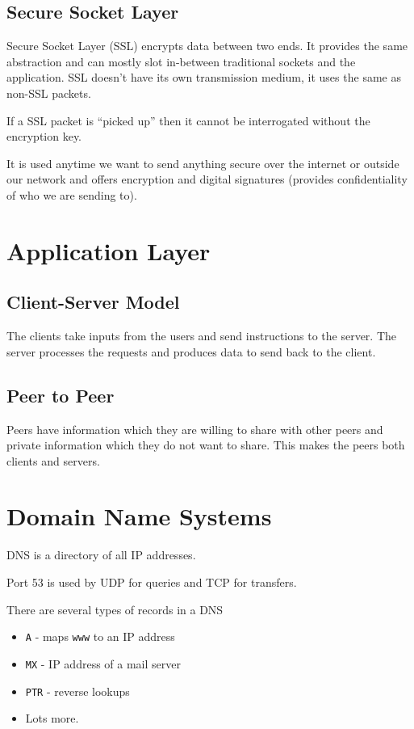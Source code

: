 \subsection*{Secure Socket Layer}

Secure Socket Layer (SSL) encrypts data between two ends. It provides the same abstraction and can mostly slot in-between traditional sockets and the application. SSL doesn't have its own transmission medium, it uses the same as non-SSL packets.

If a SSL packet is ``picked up'' then it cannot be interrogated without the encryption key.

It is used anytime we want to send anything secure over the internet or outside our network and offers encryption and digital signatures (provides confidentiality of who we are sending to). 

\section*{Application Layer}
\subsection*{Client-Server Model}
The clients take inputs from the users and send instructions to the server. The server processes the requests and produces data to send back to the client. 
\subsection*{Peer to Peer}
Peers have information which they are willing to share with other peers and private information which they do not want to share. This makes the peers both clients and servers.

\section*{Domain Name Systems}
DNS is a directory of all IP addresses.

Port 53 is used by UDP for queries and TCP for transfers.

There are several types of records in a DNS
\begin{itemize}
    \item \verb|A| - maps \verb|www| to an IP address
    \item \verb|MX| - IP address of a mail server
    \item \verb|PTR| - reverse lookups
    \item Lots more.
\end{itemize}

